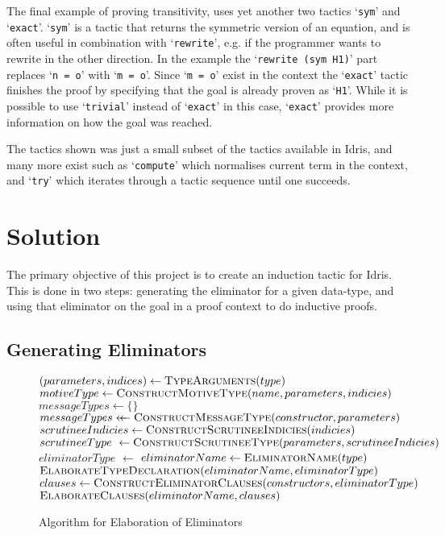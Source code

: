 \documentclass[a4paper]{article}%
\begin{document}
The final example of proving transitivity, uses yet another two tactics `\texttt{sym}' and `\texttt{exact}'. `\texttt{sym}' is a tactic that returns the symmetric version of an equation, and is often useful in combination
with `\texttt{rewrite}', e.g. if the programmer wants to rewrite in the other direction. In the example the `\texttt{rewrite (sym H1)}' part replaces `\texttt{n = o}' with `\texttt{m = o}'. Since `\texttt{m = o}' exist in
the context the `\texttt{exact}' tactic finishes the proof by specifying that the goal is already proven as `\texttt{H1}'. While it is possible to use `\texttt{trivial}' instead of `\texttt{exact}' in this case, `\texttt{exact}' provides
more information on how the goal was reached.

The tactics shown was just a small subset of the tactics available in Idris, and many more exist such as `\texttt{compute}' which normalises current term in the context, and `\texttt{try}' which iterates through a tactic sequence until one succeeds.

\section{Solution}
\label{sec:Solution}
The primary objective of this project is to create an induction tactic for Idris. This is done in two steps: generating the eliminator for a given data-type, and using that eliminator on the goal in a proof context to do inductive proofs.

\subsection{Generating Eliminators}
\label{sub:GeneratingEliminators}

\begin{figure}[H]
  \begin{center}
    \begin{algorithmic}[1]
    \State $\left(parameters, indices\right) \gets \Call{TypeArguments}{type}$
    \State $motiveType \gets \Call{ConstructMotiveType}{name, parameters, indicies}$
    \State $messageTypes \gets \{\}$
    \State $messageTypes \mathrel{\leftarrow\mkern-12mu\leftarrow} \Call{ConstructMessageType}{constructor, parameters}$
    \EndFor
    \State $scrutineeIndicies \gets \Call{ConstructScrutineeIndicies}{indicies}$
    \State $scrutineeType \gets \Call{ConstructScrutineeType}{parameters, scrutineeIndicies}$
    \State $eliminatorType$ $\gets$ 
    \State $eliminatorName \gets \Call{EliminatorName}{type}$
    \State $\Call{ElaborateTypeDeclaration}{eliminatorName, eliminatorType}$
      \State $clauses \gets \Call{ConstructEliminatorClauses}{constructors, eliminatorType}$
      \State $\Call{ElaborateClauses}{eliminatorName, clauses}$
    \EndIf
    \EndProcedure
  \end{algorithmic}
  \end{center}
\caption{Algorithm for Elaboration of Eliminators}
\label{fig:elabelim}
\end{figure}
\end{document}
